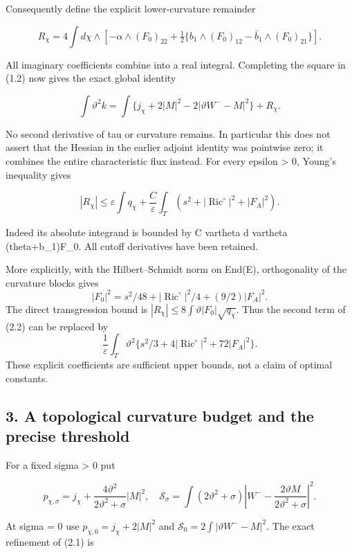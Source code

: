 \documentclass[
  10pt,
]{article}
\begin{document}
Consequently define the explicit lower-curvature remainder

\[
 R_\chi=4\int d\chi\wedge\left[
 -\alpha\wedge(F_0)_{22}
 +\tfrac12\{b_1\wedge(F_0)_{12}-\bar b_1\wedge(F_0)_{21}\}\right].
\]

All imaginary coefficients combine into a real integral. Completing the
square in (1.2) now gives the exact global identity

\[
 \boxed{\int\vartheta^2k
 =\int\{j_\chi+2|M|^2-2|\vartheta W^--M|^2\}+R_\chi.}     \tag{2.1}
\]

No second derivative of tau or curvature remains. In particular this
does not assert that the Hessian in the earlier adjoint identity was
pointwise zero; it combines the entire characteristic flux instead. For
every epsilon \textgreater{} 0, Young's inequality gives

\[
 |R_\chi|\le\varepsilon\int q_\chi
 +\frac C\varepsilon\int_T
       (s^2+|\operatorname{Ric}^{\circ}|^2+|F_A|^2).       \tag{2.2}
\]

Indeed its absolute integrand is bounded by C vartheta \textbar d
vartheta\textbar{}
(\textbar theta\textbar+\textbar b\_1\textbar)\textbar F\_0\textbar. All
cutoff derivatives have been retained.

More explicitly, with the Hilbert--Schmidt norm on End(E), orthogonality
of the curvature blocks gives \[
 |F_0|^2=s^2/48+|\operatorname{Ric}^{\circ}|^2/4+(9/2)|F_A|^2.
\] The direct transgression bound is
\(|R_\chi|\le8\int\vartheta|F_0|\sqrt{q_\chi}\). Thus the second term of
(2.2) can be replaced by \[
 \frac1\varepsilon\int_T\vartheta^2
           \{s^2/3+4|\operatorname{Ric}^{\circ}|^2+72|F_A|^2\}.
\] These explicit coefficients are sufficient upper bounds, not a claim
of optimal constants.

\hypertarget{a-topological-curvature-budget-and-the-precise-threshold}{%
\subsection{3. A topological curvature budget and the precise
threshold}\label{a-topological-curvature-budget-and-the-precise-threshold}}

For a fixed sigma \textgreater{} 0 put

\[
 p_{\chi,\sigma}=j_\chi+
                   \frac{4\vartheta^2}{2\vartheta^2+\sigma}|M|^2,
 \quad
 \mathcal S_\sigma=\int(2\vartheta^2+\sigma)
        \left|W^--\frac{2\vartheta M}{2\vartheta^2+\sigma}\right|^2.
\]

At sigma = 0 use \(p_{\chi,0}=j_\chi+2|M|^2\) and
\(\mathcal S_0=2\int|\vartheta W^--M|^2\). The exact refinement of (2.1)
is
\end{document}
